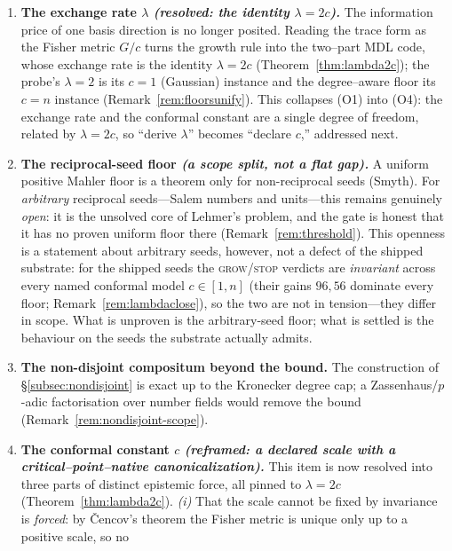 \documentclass[11pt]{article}
\theoremstyle{plain}
\theoremstyle{definition}
\theoremstyle{remark}
\newcommand{\GG}{G}
\begin{document}
\begin{enumerate}[label=(O\arabic*),leftmargin=*]
  \item \textbf{The exchange rate $\lambda$ \emph{(resolved: the identity $\lambda=2c$).}} The information price
        of one basis direction is no longer posited. Reading the trace form as the Fisher metric $\GG/c$ turns the
        growth rule into the two--part MDL code, whose exchange rate is the identity $\lambda=2c$
        (Theorem~\ref{thm:lambda2c}); the probe's $\lambda=2$ is its $c=1$ (Gaussian) instance and the
        degree--aware floor its $c=n$ instance (Remark~\ref{rem:floorsunify}). This collapses (O1) into (O4): the
        exchange rate and the conformal constant are a single degree of freedom, related by $\lambda=2c$, so
        ``derive $\lambda$'' becomes ``declare $c$,'' addressed next.
  \item \textbf{The reciprocal-seed floor \emph{(a scope split, not a flat gap).}} A uniform positive Mahler
        floor is a theorem only for non-reciprocal seeds (Smyth). For \emph{arbitrary} reciprocal seeds---Salem
        numbers and units---this remains genuinely \emph{open}: it is the unsolved core of Lehmer's problem, and
        the gate is honest that it has no proven uniform floor there (Remark~\ref{rem:threshold}). This openness
        is a statement about arbitrary seeds, however, not a defect of the shipped substrate: for the shipped
        seeds the \textsc{grow}/\textsc{stop} verdicts are \emph{invariant} across every named conformal model
        $c\in[1,n]$ (their gains $96,56$ dominate every floor; Remark~\ref{rem:lambdaclose}), so the two are not
        in tension---they differ in scope. What is unproven is the arbitrary-seed floor; what is settled is the
        behaviour on the seeds the substrate actually admits.
  \item \textbf{The non-disjoint compositum beyond the bound.} The construction of \S\ref{subsec:nondisjoint}
        is exact up to the Kronecker degree cap; a Zassenhaus/$p$-adic factorisation over number fields would
        remove the bound (Remark~\ref{rem:nondisjoint-scope}).
  \item \textbf{The conformal constant $c$ \emph{(reframed: a declared scale with a critical--point--native
        canonicalization).}} This item is now resolved into three parts of distinct epistemic force, all pinned
        to $\lambda=2c$ (Theorem~\ref{thm:lambda2c}). \emph{(i)} That the scale cannot be fixed by invariance is
        \emph{forced}: by \v{C}encov's theorem the Fisher metric is unique only up to a positive scale, so no

\end{enumerate}
\end{document}
